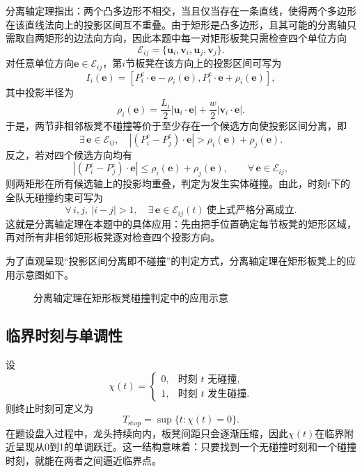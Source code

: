 分离轴定理指出：两个凸多边形不相交，当且仅当存在一条直线，使得两个多边形在该直线法向上的投影区间互不重叠。由于矩形是凸多边形，且其可能的分离轴只需取自两矩形的边法向方向，因此本题中每一对矩形板凳只需检查四个单位方向
\[
\mathcal{E}_{ij}=\{\bm{u}_i,\bm{v}_i,\bm{u}_j,\bm{v}_j\}.
\]
对任意单位方向$\bm{e}\in\mathcal{E}_{ij}$，第$i$节板凳在该方向上的投影区间可写为
\[
I_i(\bm{e})=
\left[
P_i^{\mathrm{c}}\cdot\bm{e}-\rho_i(\bm{e}),
P_i^{\mathrm{c}}\cdot\bm{e}+\rho_i(\bm{e})
\right],
\]
其中投影半径为
\[
\rho_i(\bm{e})
=\frac{L_i}{2}\left|\bm{u}_i\cdot\bm{e}\right|
+\frac{w}{2}\left|\bm{v}_i\cdot\bm{e}\right|.
\]
于是，两节非相邻板凳不碰撞等价于至少存在一个候选方向使投影区间分离，即
\[
\exists\,\bm{e}\in\mathcal{E}_{ij},\quad
\left|
\left(P_i^{\mathrm{c}}-P_j^{\mathrm{c}}\right)\cdot\bm{e}
\right|
>
\rho_i(\bm{e})+\rho_j(\bm{e}).
\]
反之，若对四个候选方向均有
\[
\left|
\left(P_i^{\mathrm{c}}-P_j^{\mathrm{c}}\right)\cdot\bm{e}
\right|
\le
\rho_i(\bm{e})+\rho_j(\bm{e}),
\qquad \forall\,\bm{e}\in\mathcal{E}_{ij},
\]
则两矩形在所有候选轴上的投影均重叠，判定为发生实体碰撞。由此，时刻$t$下的全队无碰撞约束可写为
\[
\forall\, i,j,\ |i-j|>1,\quad
\exists\,\bm{e}\in\mathcal{E}_{ij}(t)\ \text{使上式严格分离成立}.
\]
这就是分离轴定理在本题中的具体应用：先由把手位置确定每节板凳的矩形区域，再对所有非相邻矩形板凳逐对检查四个投影方向。

为了直观呈现“投影区间分离即不碰撞”的判定方式，分离轴定理在矩形板凳上的应用示意图如下。

\begin{figure}[H]
\centering
{}
\caption{分离轴定理在矩形板凳碰撞判定中的应用示意}
\label{fig:q2-sat}
\end{figure}

\subsection{临界时刻与单调性}
设
\[
\chi(t)=
\begin{cases}
0, & \text{时刻 } t \text{ 无碰撞},\\
1, & \text{时刻 } t \text{ 发生碰撞}.
\end{cases}
\]
则终止时刻可定义为
\[
T_{\mathrm{stop}}=\sup\{t:\chi(t)=0\}.
\]
在题设盘入过程中，龙头持续向内，板凳间距只会逐渐压缩，因此$\chi(t)$在临界附近呈现从0到1的单调跃迁。这一结构意味着：只要找到一个无碰撞时刻和一个碰撞时刻，就能在两者之间逼近临界点。

